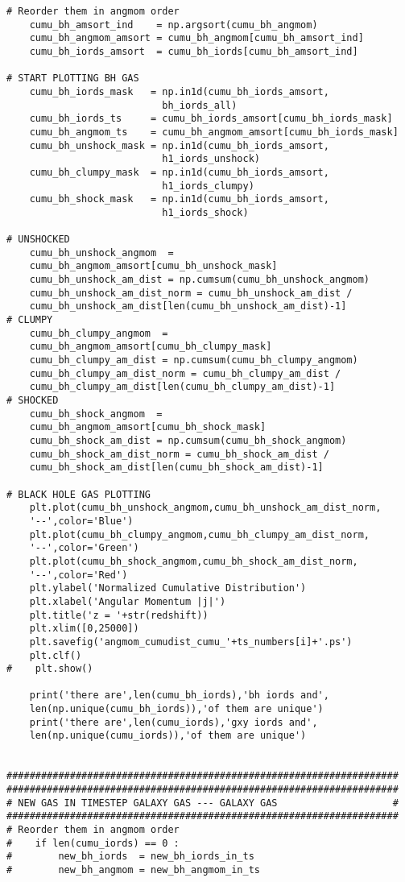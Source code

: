 \documentclass[12pt,headA,chapB]{fiskthesis}
\begin{document}
\begin{verbatim}
# Reorder them in angmom order    
    cumu_bh_amsort_ind    = np.argsort(cumu_bh_angmom)
    cumu_bh_angmom_amsort = cumu_bh_angmom[cumu_bh_amsort_ind]
    cumu_bh_iords_amsort  = cumu_bh_iords[cumu_bh_amsort_ind] 

# START PLOTTING BH GAS
    cumu_bh_iords_mask   = np.in1d(cumu_bh_iords_amsort,
                           bh_iords_all)
    cumu_bh_iords_ts     = cumu_bh_iords_amsort[cumu_bh_iords_mask]
    cumu_bh_angmom_ts    = cumu_bh_angmom_amsort[cumu_bh_iords_mask]    
    cumu_bh_unshock_mask = np.in1d(cumu_bh_iords_amsort,
                           h1_iords_unshock)
    cumu_bh_clumpy_mask  = np.in1d(cumu_bh_iords_amsort,
                           h1_iords_clumpy)
    cumu_bh_shock_mask   = np.in1d(cumu_bh_iords_amsort,
                           h1_iords_shock)

# UNSHOCKED
    cumu_bh_unshock_angmom  = 
    cumu_bh_angmom_amsort[cumu_bh_unshock_mask]
    cumu_bh_unshock_am_dist = np.cumsum(cumu_bh_unshock_angmom)
    cumu_bh_unshock_am_dist_norm = cumu_bh_unshock_am_dist / 
    cumu_bh_unshock_am_dist[len(cumu_bh_unshock_am_dist)-1]
# CLUMPY
    cumu_bh_clumpy_angmom  = 
    cumu_bh_angmom_amsort[cumu_bh_clumpy_mask]
    cumu_bh_clumpy_am_dist = np.cumsum(cumu_bh_clumpy_angmom)
    cumu_bh_clumpy_am_dist_norm = cumu_bh_clumpy_am_dist / 
    cumu_bh_clumpy_am_dist[len(cumu_bh_clumpy_am_dist)-1]
# SHOCKED
    cumu_bh_shock_angmom  = 
    cumu_bh_angmom_amsort[cumu_bh_shock_mask]
    cumu_bh_shock_am_dist = np.cumsum(cumu_bh_shock_angmom)
    cumu_bh_shock_am_dist_norm = cumu_bh_shock_am_dist / 
    cumu_bh_shock_am_dist[len(cumu_bh_shock_am_dist)-1]

# BLACK HOLE GAS PLOTTING
    plt.plot(cumu_bh_unshock_angmom,cumu_bh_unshock_am_dist_norm,
    '--',color='Blue')
    plt.plot(cumu_bh_clumpy_angmom,cumu_bh_clumpy_am_dist_norm,
    '--',color='Green')
    plt.plot(cumu_bh_shock_angmom,cumu_bh_shock_am_dist_norm,
    '--',color='Red')
    plt.ylabel('Normalized Cumulative Distribution')
    plt.xlabel('Angular Momentum |j|')
    plt.title('z = '+str(redshift))
    plt.xlim([0,25000])
    plt.savefig('angmom_cumudist_cumu_'+ts_numbers[i]+'.ps')
    plt.clf()
#    plt.show()

    print('there are',len(cumu_bh_iords),'bh iords and',
    len(np.unique(cumu_bh_iords)),'of them are unique')
    print('there are',len(cumu_iords),'gxy iords and',
    len(np.unique(cumu_iords)),'of them are unique')


####################################################################
####################################################################
# NEW GAS IN TIMESTEP GALAXY GAS --- GALAXY GAS                    #
####################################################################
# Reorder them in angmom order
#    if len(cumu_iords) == 0 :
#        new_bh_iords  = new_bh_iords_in_ts
#        new_bh_angmom = new_bh_angmom_in_ts
    

\end{verbatim}
\end{document}

